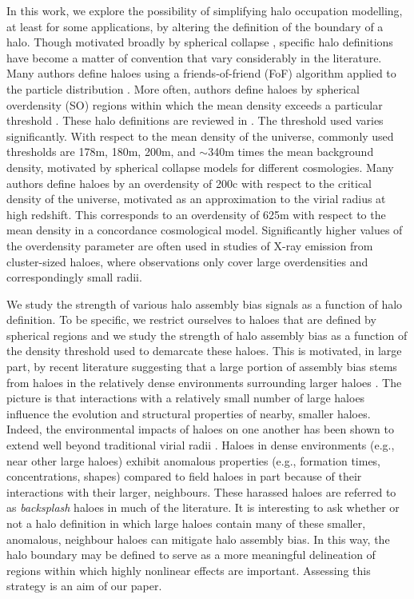 \documentclass[usenatbib,fleqn]{mnras}
\begin{document}
In this work, we explore the possibility of simplifying halo occupation modelling, at least for some applications, by altering the definition of the boundary of a halo. Though motivated broadly by spherical collapse \citep{gunn_gott72, fillmore_goldreich84, ryden_gunn87, lacey_cole93, eke_etal96, mota_vandebruck04, pace_etal10}, specific halo definitions have become a matter of convention that vary considerably in the literature. Many authors define haloes using a friends-of-friend (FoF) algorithm applied to the particle distribution \citep[e.g., ][]{davis_etal85}. More often, authors define haloes by spherical overdensity (SO) regions within which the mean density exceeds a particular threshold \citep[e.g., ][]{lacey_cole93}. These halo definitions are reviewed in \citet[][and references therein]{knebe_etal11}. The threshold used varies significantly. With respect to the mean density of the universe, commonly used thresholds are 178m, 180m, 200m, and $\sim$340m times the mean background density, motivated by spherical collapse models for different cosmologies. Many authors define haloes by an overdensity of 200c with respect to the critical density of the universe, motivated as an approximation to the virial radius at high redshift. This corresponds to an overdensity of 625m with respect to the mean density in a concordance cosmological model. Significantly higher values of the overdensity parameter are often used in studies of X-ray emission from cluster-sized haloes, where observations only cover large overdensities and correspondingly small radii.

We study the strength of various halo assembly bias signals as a function of halo definition. To be specific, we restrict ourselves to haloes that are defined by spherical regions and we study the strength of halo assembly bias as a function of the density threshold used to demarcate these haloes. This is motivated, in large part, by recent literature suggesting that a large portion of assembly bias stems from haloes in the relatively dense environments surrounding larger haloes \citep{wang_etal07,warnick_etal08,hahn_etal09,ludlow_etal09,lacerna_padilla11,more_etal15,sunayama_etal16}. The picture is that interactions with a relatively small number of large haloes influence the evolution and structural properties of nearby, smaller haloes. Indeed, the environmental impacts of haloes on one another has been shown to extend well beyond traditional virial radii \citep{wetzel_etal14, diemer_kravtsov14, behroozi_etal13b, adhikari_etal14, wetzel_nagai15, more_etal15, hearin_etal16}. Haloes in dense environments (e.g., near other large haloes) exhibit anomalous properties (e.g., formation times, concentrations, shapes) compared to field haloes in part because of their interactions with their larger, neighbours. These harassed haloes are referred to as {\em backsplash} haloes in much of the literature. It is interesting to ask whether or not a halo definition in which large haloes contain many of these smaller, anomalous, neighbour haloes can mitigate halo assembly bias. In this way, the halo boundary may be defined to serve as a more meaningful delineation of regions within which highly nonlinear effects are important. Assessing this strategy is an aim of our paper. 
\end{document}
